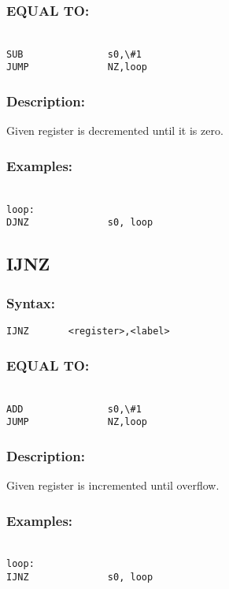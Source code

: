         \subsubsection{EQUAL TO:}
        {
            ~\\
            \usecodefont
            \verb'SUB               s0,\#1'\\
            \verb'JUMP              NZ,loop'\\
        }
        \subsubsection{Description:}
            Given register is decremented until it is zero.

        \subsubsection{Examples:}
        {
            ~\\
            \usecodefont
            \verb'loop:             '\\
            \verb'DJNZ              s0, loop'\\
        }

    \subsection{IJNZ}
        \subsubsection{Syntax:}
            \verb'IJNZ       <register>,<label>'

        \subsubsection{EQUAL TO:}
        {
            ~\\
            \usecodefont
            \verb'ADD               s0,\#1'\\
            \verb'JUMP              NZ,loop'\\
        }
        \subsubsection{Description:}
            Given register is incremented until overflow.

        \subsubsection{Examples:}
        {
            ~\\
            \usecodefont
            \verb'loop:             '\\
            \verb'IJNZ              s0, loop'\\
        }

